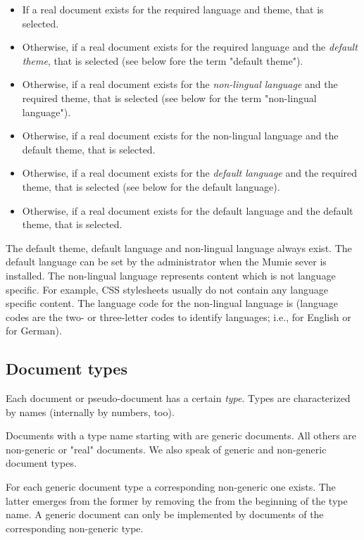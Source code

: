 \documentclass{generic}
\begin{document}
\begin{itemize}
\item If a real document exists for the required language and theme, that is
  selected.
\item Otherwise, if a real document exists for the required language and the
  \emph{default theme}, that is selected (see below fore the term "default
  theme").
\item Otherwise, if a real document exists for the \emph{non-lingual language}
  and the required theme, that is selected (see below for the term "non-lingual
  language").
\item Otherwise, if a real document exists for the non-lingual language
  and the default theme, that is selected.
\item Otherwise, if a real document exists for the \emph{default language}
  and the required theme, that is selected (see below for the  default language).
\item Otherwise, if a real document exists for the default language
  and the default theme, that is selected.
\end{itemize}

The default theme, default language and non-lingual language always exist. The
default language can be set by the administrator when the Mumie sever is
installed. The non-lingual language represents content which is not language
specific. For example, CSS stylesheets usually do not contain any language
specific content. The language code for the non-lingual language is 
(language codes are the two- or three-letter codes to identify languages; i.e.,
 for English or  for German).


\subsection{Document types}\label{doc_types}

Each document or pseudo-document has a certain \emph{type}. Types are
characterized by names (internally by numbers, too).

Documents with a type name starting with  are generic documents. All
others are non-generic or "real" documents. We also speak of generic and
non-generic document types.

For each generic document type a corresponding non-generic one exists. The
latter emerges from the former by removing the  from the
beginning of the type name. A generic document can only be implemented by documents
of the corresponding non-generic type.
\end{document}
